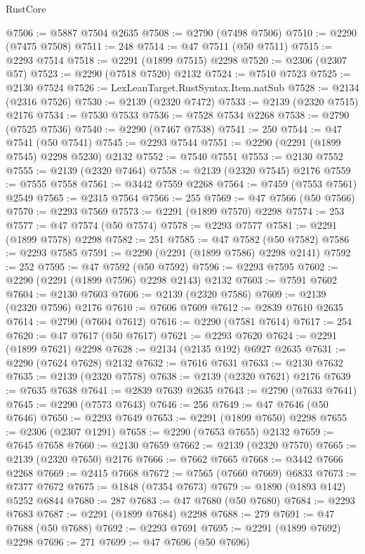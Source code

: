 \begin{lexlean}{RustCore}
\begin{coremodule}
@7506 := @5887 @7504 @2635
@7508 := @2790 (@7498 @7506)
@7510 := @2290 (@7475 @7508)
@7511 := 248
@7514 := @47 @7511 (@50 @7511)
@7515 := @2293 @7514
@7518 := @2291 (@1899 @7515) @2298
@7520 := @2306 (@2307 @57)
@7523 := @2290 (@7518 @7520) @2132
@7524 := @7510 @7523
@7525 := @2130 @7524
@7526 := LexLeanTarget.RustSyntax.Item.natSub
@7528 := @2134 (@2316 @7526)
@7530 := @2139 (@2320 @7472)
@7533 := @2139 (@2320 @7515) @2176
@7534 := @7530 @7533
@7536 := @7528 @7534 @2268
@7538 := @2790 (@7525 @7536)
@7540 := @2290 (@7467 @7538)
@7541 := 250
@7544 := @47 @7541 (@50 @7541)
@7545 := @2293 @7544
@7551 := @2290 (@2291 (@1899 @7545) @2298 @5230) @2132
@7552 := @7540 @7551
@7553 := @2130 @7552
@7555 := @2139 (@2320 @7464)
@7558 := @2139 (@2320 @7545) @2176
@7559 := @7555 @7558
@7561 := @3442 @7559 @2268
@7564 := @7459 (@7553 @7561) @2549
@7565 := @2315 @7564
@7566 := 255
@7569 := @47 @7566 (@50 @7566)
@7570 := @2293 @7569
@7573 := @2291 (@1899 @7570) @2298
@7574 := 253
@7577 := @47 @7574 (@50 @7574)
@7578 := @2293 @7577
@7581 := @2291 (@1899 @7578) @2298
@7582 := 251
@7585 := @47 @7582 (@50 @7582)
@7586 := @2293 @7585
@7591 := @2290 (@2291 (@1899 @7586) @2298 @2141)
@7592 := 252
@7595 := @47 @7592 (@50 @7592)
@7596 := @2293 @7595
@7602 := @2290 (@2291 (@1899 @7596) @2298 @2143) @2132
@7603 := @7591 @7602
@7604 := @2130 @7603
@7606 := @2139 (@2320 @7586)
@7609 := @2139 (@2320 @7596) @2176
@7610 := @7606 @7609
@7612 := @2839 @7610 @2635
@7614 := @2790 (@7604 @7612)
@7616 := @2290 (@7581 @7614)
@7617 := 254
@7620 := @47 @7617 (@50 @7617)
@7621 := @2293 @7620
@7624 := @2291 (@1899 @7621) @2298
@7628 := @2134 (@2135 @192) @6927 @2635
@7631 := @2290 (@7624 @7628) @2132
@7632 := @7616 @7631
@7633 := @2130 @7632
@7635 := @2139 (@2320 @7578)
@7638 := @2139 (@2320 @7621) @2176
@7639 := @7635 @7638
@7641 := @2839 @7639 @2635
@7643 := @2790 (@7633 @7641)
@7645 := @2290 (@7573 @7643)
@7646 := 256
@7649 := @47 @7646 (@50 @7646)
@7650 := @2293 @7649
@7653 := @2291 (@1899 @7650) @2298
@7655 := @2306 (@2307 @1291)
@7658 := @2290 (@7653 @7655) @2132
@7659 := @7645 @7658
@7660 := @2130 @7659
@7662 := @2139 (@2320 @7570)
@7665 := @2139 (@2320 @7650) @2176
@7666 := @7662 @7665
@7668 := @3442 @7666 @2268
@7669 := @2415 @7668
@7672 := @7565 (@7660 @7669) @6833
@7673 := @7377 @7672
@7675 := @1848 (@7354 @7673)
@7679 := @1890 (@1893 @142) @5252 @6844
@7680 := 287
@7683 := @47 @7680 (@50 @7680)
@7684 := @2293 @7683
@7687 := @2291 (@1899 @7684) @2298
@7688 := 279
@7691 := @47 @7688 (@50 @7688)
@7692 := @2293 @7691
@7695 := @2291 (@1899 @7692) @2298
@7696 := 271
@7699 := @47 @7696 (@50 @7696)

\end{coremodule}
\end{lexlean}
